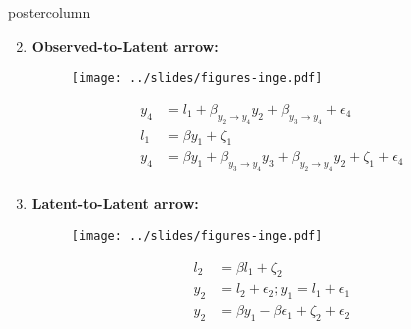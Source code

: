 \documentclass{beamer}
\newlength{\columnheight}
\begin{document}
\begin{frame}
\begin{columns}

	\begin{column}{.33\textwidth}
 		\begin{beamercolorbox}[center]{postercolumn}
 			\begin{minipage}{.98\textwidth} %
 				\parbox[t][\columnheight]{\textwidth}{ %
					\begin{myblock}{}
						\begin{enumerate}
							\setcounter{enumi}{1}
							\item \textbf{Observed-to-Latent arrow:}
								\begin{figure}
									\centering
									\texttt{[image: ../slides/figures-inge.pdf]}
									\label{fig:l2o_obs_lat}
								\end{figure}
								\begin{equation*}
									\begin{split}
										y_4 &= l_1 + \beta_{y_2 \to y_4} y_2 + \beta_{y_3 \to y_4} + \epsilon_4 \\
										l_1 &= \beta y_1 + \zeta_1 \\
										y_4 &= \beta y_1 + \beta_{y_3 \to y_4} y_3 + \beta_{y_2 \to y_4} y_2 + \zeta_1 + \epsilon_4 \\
									\end{split}
								\end{equation*}
							\vspace{0.6em}	
							\item \textbf{Latent-to-Latent arrow:}
								\begin{figure}
									\centering
									\texttt{[image: ../slides/figures-inge.pdf]}
									\label{fig:l2o_lat_lat}
								\end{figure}
								\begin{equation*}
									\begin{split}
										l_2 &= \beta l_1 + \zeta_2 \\
										y_2 &= l_2 + \epsilon_2; y_1 = l_1 + \epsilon_1 \\
										y_2 &= \beta y_1 - \beta \epsilon_1 + \zeta_2 + \epsilon_2
									\end{split}
								\end{equation*}

\end{enumerate}
\end{myblock}}
\end{minipage}
\end{beamercolorbox}
\end{column}
\end{columns}
\end{frame}
\end{document}
